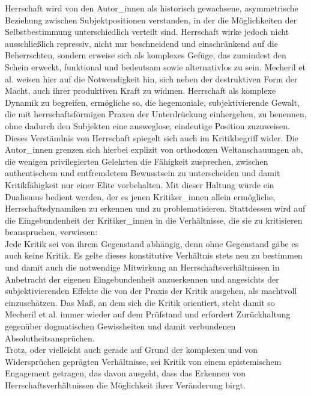 \noindent Herrschaft wird von den Autor\_innen als historisch gewachsene,
asymmetrische Beziehung zwischen Subjektpositionen verstanden, in der die
Möglichkeiten der Selbstbestimmung unterschiedlich verteilt sind. Herrschaft
wirke jedoch nicht ausschließlich repressiv, nicht nur beschneidend und
einschränkend auf die Beherrschten, sondern erweise sich als komplexes Gefüge,
das zumindest den Schein erweckt, \glqq funktional und bedeutsam\grqq \footnotemark {} sowie
alternativlos zu sein. Mecheril et al. weisen hier auf die Notwendigkeit hin,
sich neben der destruktiven Form der Macht, auch ihrer produktiven Kraft zu
widmen. Herrschaft als komplexe Dynamik zu begreifen, ermögliche so, die
hegemoniale, subjektivierende Gewalt, die mit herrschaftsförmigen Praxen der
Unterdrückung einhergehen, zu benennen, ohne dadurch den Subjekten eine
ausweglose, eindeutige Position zuzuweisen.\footnotemark {}\\
Dieses Verständnis von Herrschaft
spiegelt sich auch im Kritikbegriff wider. Die Autor\_innen grenzen sich hierbei
explizit von orthodoxen Weltanschauungen ab, die wenigen privilegierten
Gelehrten die Fähigkeit zusprechen, zwischen authentischem und entfremdetem
Bewusstsein zu unterscheiden und damit Kritikfähigkeit nur einer Elite
vorbehalten. Mit dieser Haltung würde ein Dualismus bedient werden, der es
jenen Kritiker\_innen allein ermögliche, Herrschaftsdynamiken zu erkennen und zu
problematisieren.\footnotemark {} 
Stattdessen wird auf die Eingebundenheit der Kritiker\_innen
in die Verhältnisse, die sie zu kritisieren beanspruchen, verwiesen:\\
Jede
Kritik sei von ihrem Gegenstand abhängig, denn ohne Gegenstand gäbe es auch
keine Kritik. Es gelte dieses konstitutive Verhältnis stets neu zu bestimmen
und damit auch die notwendige Mitwirkung an Herrschaftsverhältnissen in
Anbetracht der eigenen Eingebundenheit anzuerkennen und angesichts der
\glqq subjektivierenden Effekte\grqq\footnotemark {} die von der Praxis der Kritik ausgehen, als
machtvoll einzuschätzen. Das Maß, an dem sich die Kritik orientiert, steht
damit so Mecheril et al. immer wieder auf dem Prüfstand und erfordert
Zurückhaltung gegenüber dogmatischen Gewissheiten und damit verbundenen
Absolutheitsansprüchen.\footnotemark {} \\
Trotz, oder vielleicht auch gerade auf Grund der
komplexen und von Widersprüchen geprägten Verhältnisse, sei Kritik von einem
epistemischem Engagement getragen, das davon ausgeht, dass das Erkennen von
Herrschaftsverhältnissen die Möglichkeit ihrer Veränderung birgt.\footnotemark
{}\\

